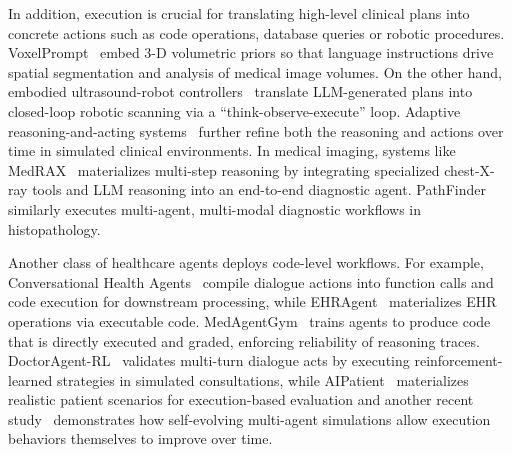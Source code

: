 In addition, execution is crucial for translating high-level clinical plans into concrete actions such as code operations, database queries or robotic procedures. VoxelPrompt~\cite{hoopes2024voxelpromptvisionlanguageagentgrounded} embed 3-D volumetric priors so that language instructions drive spatial segmentation and analysis of medical image volumes. On the other hand, embodied ultrasound-robot controllers~\cite{xu2024enhancingsurgicalrobotsembodied} translate LLM-generated plans into closed-loop robotic scanning via a “think-observe-execute” loop.
Adaptive reasoning-and-acting systems~\cite{dutta2024adaptivereasoningactingmedical} further refine both the reasoning and actions over time in simulated clinical environments. In medical imaging, systems like MedRAX~\cite{fallahpour2025medraxmedicalreasoningagent} materializes multi-step reasoning by integrating specialized chest-X-ray tools and LLM reasoning into an end-to-end diagnostic agent. PathFinder~\cite{ghezloo2025pathfinder} similarly executes multi-agent, multi-modal diagnostic workflows in histopathology.

Another class of healthcare agents deploys code-level workflows. For example, Conversational Health Agents~\cite{abbasian2024conversationalhealthagentspersonalized} compile dialogue actions into function calls and code execution for downstream processing, while EHRAgent~\cite{wenqi2024ehragent} materializes EHR operations via executable code. MedAgentGym~\cite{xu2025medagentgymscalableagentictraining} trains agents to produce code that is directly executed and graded, enforcing reliability of reasoning traces. DoctorAgent-RL~\cite{feng2025doctoragentrlmultiagentcollaborativereinforcement} validates multi-turn dialogue acts by executing reinforcement-learned strategies in simulated consultations, while AIPatient~\cite{yu2025simulated} materializes realistic patient scenarios for execution-based evaluation and another recent study~\cite{almansoori2025selfevolvingmultiagentsimulationsrealistic} demonstrates how self-evolving multi-agent simulations allow execution behaviors themselves to improve over time.



